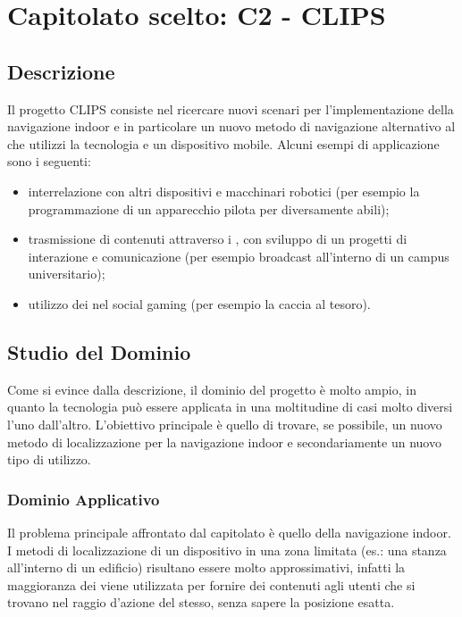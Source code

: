 \section{Capitolato scelto: C2 - CLIPS}

\subsection{Descrizione}

Il progetto CLIPS consiste nel ricercare nuovi scenari per l'implementazione della navigazione indoor e in particolare 
un nuovo metodo di navigazione alternativo al  che utilizzi la tecnologia  e un dispositivo mobile.
Alcuni esempi di applicazione sono i seguenti:
\begin{itemize}
	\item interrelazione con altri dispositivi e macchinari robotici (per esempio la programmazione di un apparecchio pilota per diversamente abili);
	\item trasmissione di contenuti attraverso i , con sviluppo di un progetti di interazione e comunicazione (per esempio broadcast all'interno di un campus universitario);
	\item utilizzo dei  nel social gaming (per esempio la caccia al tesoro).
\end{itemize}

\subsection{Studio del Dominio}

Come si evince dalla descrizione, il dominio del progetto è molto ampio, in quanto la tecnologia  può essere applicata in una moltitudine
di casi molto diversi l'uno dall'altro. L'obiettivo principale è quello di trovare, se possibile, un nuovo metodo di localizzazione per la navigazione indoor e secondariamente
un nuovo tipo di utilizzo.


\subsubsection{Dominio Applicativo}
Il problema principale affrontato dal capitolato è quello della navigazione indoor. I metodi di localizzazione di un dispositivo in una zona limitata (es.: una stanza all'interno di un edificio)
risultano essere molto approssimativi, infatti la maggioranza dei  viene utilizzata per fornire dei contenuti agli utenti che si trovano nel raggio d'azione del  stesso, senza sapere 
la posizione esatta.

